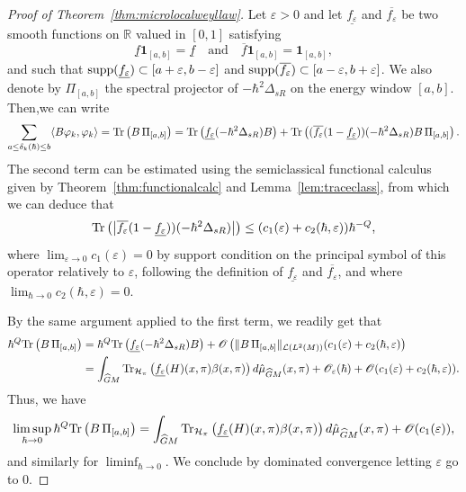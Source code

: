 \documentclass[12pt,a4paper]{amsart}
\theoremstyle{plain}
\theoremstyle{definition}
\theoremstyle{remark}
\numberwithin{equation}{section}
\theoremstyle{definition}
\def\eps{\varepsilon}
\def\R{{\mathbb R}}%
\def \O{\mathscr{O}}
\def \Ghat{\widehat{G}}
\numberwithin{equation}{section}
\begin{document}
\begin{proof}[Proof of Theorem~\ref{thm:microlocalweyllaw}]
    Let $\eps>0$ and let $\underline{f_\eps}$ and $\overline{f_\eps}$ be two smooth functions on $\R$ valued in $[0,1]$ satisfying
    \begin{equation*}
        \underline{f} {\bm 1}_{[a,b]} = \underline{f}\quad \mbox{and}\quad 
        \overline{f} {\bm 1}_{[a,b]} = {\bm 1}_{[a,b]}, 
    \end{equation*}
    and such that ${\rm supp}(\underline{f_\eps})\subset [a+\eps,b-\eps]$ and ${\rm supp}(\overline{f_\eps})\subset [a-\eps,b+\eps]$.
    We also denote by $\Pi_{[a,b]}$ the spectral projector of $-\hbar^2\Delta_{sR}$ on the energy window $[a,b]$. Then,we can write
    \begin{equation*}
        \sum_{a\leq \delta_k(\hbar)\leq b}\langle B\varphi_k,\varphi_k\rangle = {\rm Tr}\left( B \,\Pi_{[a,b]}\right) = {\rm Tr}\left(\underline{f_\eps}(-\hbar^2\Delta_{sR})B\right)+ {\rm Tr}\left((\overline{f_\eps}(1-\underline{f_\eps}))(-\hbar^2\Delta_{sR}) B\,\Pi_{[a,b]}\right).
    \end{equation*}
    The second term can be estimated using the semiclassical functional calculus given by Theorem~\ref{thm:functionalcalc} and Lemma~\ref{lem:traceclass}, from which we can deduce that
    \begin{equation*}
        {\rm Tr}\left(\left|\overline{f_\eps}(1-\underline{f_\eps}))(-\hbar^2\Delta_{sR})\right|\right)\leq (c_1(\eps) + c_2(\hbar,\eps))\hbar^{-Q},
    \end{equation*}
    where $\lim_{\eps\rightarrow 0}c_1(\eps) = 0$ by support condition on the principal symbol of this operator relatively to $\eps$, following the definition of $\underline{f_\eps}$ and $\overline{f_\eps}$, and where $\lim_{\hbar\rightarrow 0}c_2(\hbar,\eps) = 0$.

    By the same argument applied to the first term, we readily get that
    \begin{equation*}
        \begin{aligned}
            \hbar^Q {\rm Tr}\left(B \,\Pi_{[a,b]}\right)
            &= \hbar^Q {\rm Tr}\left(\underline{f_\eps}(-\hbar^2\Delta_{sR})B\right) + \O\left(\|B\,\Pi_{[a,b]}\|_{\mathcal{L}(L^2(M))}(c_1(\eps)+c_2(\hbar,\eps)\right)\\
            &= \int_{\Ghat M}{\rm Tr}_{\mathcal{H}_\pi}\left(\underline{f_\eps}(H)(x,\pi)\beta(x,\pi)\right)d\hat{\mu}_{\Ghat M}(x,\pi) + \O_\eps(\hbar) + \O(c_1(\eps)+c_2(\hbar,\eps)).
        \end{aligned}
    \end{equation*}
    Thus, we have
    \begin{equation*}
        \limsup_{\hbar\rightarrow 0} \hbar^Q {\rm Tr}\left(B \,\Pi_{[a,b]}\right) = \int_{\Ghat M}{\rm Tr}_{\mathcal{H}_\pi}\left(\underline{f_\eps}(H)(x,\pi)\beta(x,\pi)\right)d\hat{\mu}_{\Ghat M}(x,\pi) + \O(c_1(\eps)),
    \end{equation*}
    and similarly for $\liminf_{\hbar\rightarrow 0}$. We conclude by dominated convergence letting $\eps$ go to 0.
\end{proof}
\end{document}
